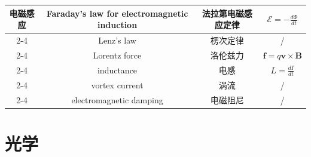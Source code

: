\documentclass{article}
\begin{document}
\begin{longtable}{|c|c|c|c|}
    \multirow{6}{*}{电磁感应}
    & Faraday's law for electromagnetic induction & 法拉第电磁感应定律 & $\mathcal{E}=-\frac{d\Phi}{dt}$ \\
    \cline{2-4}
    & Lenz's law & 楞次定律 & / \\
    \cline{2-4}
    & Lorentz force & 洛伦兹力 & $\boldsymbol{f}=q\boldsymbol{v}\times\boldsymbol{B}$ \\
    \cline{2-4}
    & inductance & 电感 & $L=\frac{dI}{dt}$ \\
    \cline{2-4}
    & vortex current & 涡流 & / \\
    \cline{2-4}
    & electromagnetic damping & 电磁阻尼 & / \\
    \hline
  \end{longtable}

  \section{光学}
\end{document}
